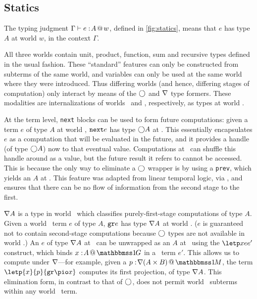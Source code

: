 \subsection{Statics}
\label{sec:statics} 



\begin{abstrsyn}

The typing judgment $\Gamma{} \vdash {e}:\!{A}~\hspace{-0.2em}\textsc{\textrm{@}}\hspace{-0.2em}~w$, defined in \ref{fig:statics}, means that
$e$ has type $A$ at world $w$, in the context $\Gamma$. 

All three worlds contain unit, product, function, sum and recursive types defined in the usual fashion.
These ``standard'' features can only be constructed from subterms of the same world,
and variables can only be used at the same world where they were introduced.
Thus differing worlds (and hence, differing stages of computation) only interact by means
of the $\bigcirc$ and $\nabla$ type formers.  These modalities are internalizations
of worlds \bbtwo\ and \bbonep, respectively, as types at world \bbonem.

At the term level, {\tt next} blocks can be used to form future computations:
given a term $e$ of type $A$ at world \bbtwo, ${\tt next}{e}$ has type $\bigcirc A$ at \bbonem. 
This essentially encapsulates $e$ as a computation that will be evaluated in the future, 
and it provides a handle (of type $\bigcirc A$) now to that eventual value.
Computations at \bbonem\ can shuffle this handle around as a value, but the future result it refers to cannot be accessed.
This is because the only way to eliminate a $\bigcirc$ wrapper is by using a {\tt prev}, which yields an $A$ at \bbtwo.
This feature was adapted from linear temporal logic, via \cite{davies96},
and ensures that there can be no flow of information from the second stage to the first.

$\nabla A$ is a type in world \bbonem\ which classifies purely-first-stage
computations of type $A$. Given a world \bbonep\ term $e$ of type $A$,
${\tt gr}{e}$ has type $\nabla A$ at world \bbonem. ($e$ is guaranteed not to contain
second-stage computations because $\bigcirc$ types are not available in world
\bbonep.)
An $e$ of type $\nabla A$ at \bbonem\ can be unwrapped as an $A$ at \bbonep\
using the $\letp xe{e'}$ construct, which binds $\colpure xA$ in a \bbonem\ term
$e'$. This allows us to compute under $\nabla$---for example, given a $\colmix
p{\curr(A\times B)}$, the term $\letp{x}{p}{\pure{\pio x}}$ computes its first
projection, of type $\nabla A$.
This elimination form, in contrast to that of $\bigcirc$, does not permit world \bbonem\ subterms
within any world \bbonep\ term.


\end{abstrsyn}
